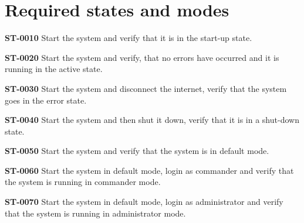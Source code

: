 \section{Required states and modes}
\begin{description}


\item\textbf{ST-0010} Start the system and verify that it is in the start-up state.
\item\textbf{ST-0020} Start the system and verify, that no errors have occurred and it is running in the active state.
\item\textbf{ST-0030} Start the system and disconnect the internet, verify that the system goes in the error state. 
\item\textbf{ST-0040} Start the system and then shut it down, verify that it is in a shut-down state.
	

\item\textbf{ST-0050} Start the system and verify that the system is in default mode.
\item\textbf{ST-0060} Start the system in default mode, login as commander and verify that the system is running in commander mode.
\item\textbf{ST-0070} Start the system in default mode, login as administrator and verify that the system is running in administrator mode.

\end{description}
